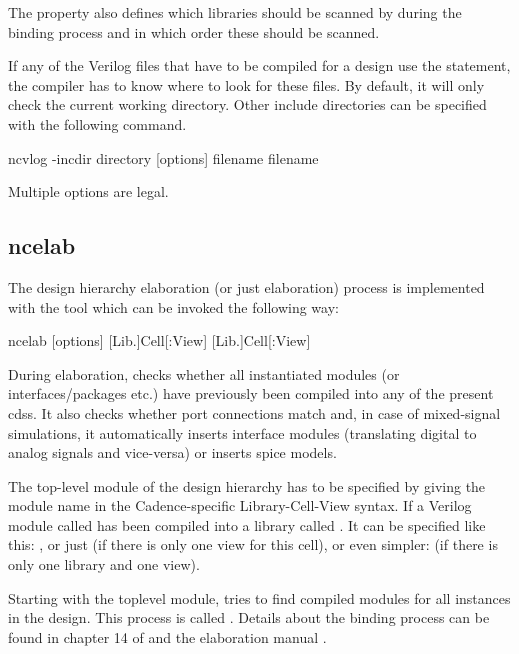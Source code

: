 The  property also defines which libraries should be scanned by
 during the binding process and in which order these should be
scanned.

If any of the Verilog files that have to be compiled for a design use the
 statement, the compiler has to know where to look for these
files. By default, it will only check the current working directory. Other
include directories can be specified with the following command.
\begin{lstbashplain}
 ncvlog -incdir directory [options] filename { filename }
\end{lstbashplain}
Multiple  options are legal.

\subsection{ncelab}
The design hierarchy elaboration (or just elaboration) process is implemented
with the tool  which can be invoked the following way:
\begin{lstbashplain}
 ncelab [options] [Lib.]Cell[:View] { [Lib.]Cell[:View] }
\end{lstbashplain}

During elaboration,  checks whether all instantiated modules (or
interfaces/packages etc.) have previously been compiled into any of the present
\glspl{cds}. It also checks whether port connections match and, in case of
mixed-signal simulations, it automatically inserts interface modules
(translating digital to analog signals and vice-versa) or inserts spice models. 

The top-level module of the design hierarchy has to be specified by giving the
module name in the Cadence-specific Library-Cell-View syntax. If a Verilog
module called  has been compiled into a library called .
It can be specified like this: , or just
 (if there is only one view for this cell), or even simpler:
 (if there is only one library and one view).

Starting with the toplevel module,  tries to find compiled modules
for all instances in the design. This process is called . Details
about the binding process can be found in chapter 14 of \citep{cds2014amssimug}
and the elaboration manual \citep{cds2014ncelab}.

